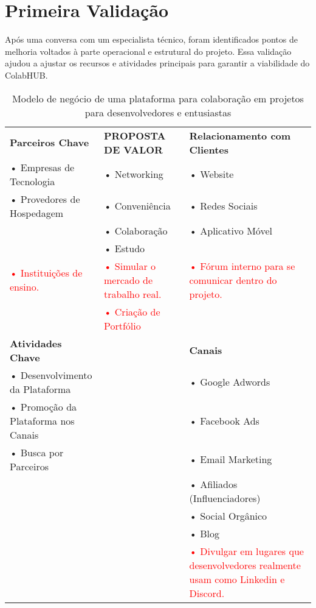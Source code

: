 \documentclass{article}
\begin{document}
\newpage


\section*{Primeira Validação}
Após uma conversa com um especialista técnico, foram identificados pontos de melhoria voltados à parte operacional e estrutural do projeto. Essa validação ajudou a ajustar os recursos e atividades principais para garantir a viabilidade do ColabHUB.

\vspace{0.5cm}

\begin{table}[H]
\centering
\caption{Modelo de negócio de uma plataforma para colaboração em projetos para desenvolvedores e entusiastas}
\renewcommand{\arraystretch}{1.8}
\setlength{\tabcolsep}{4pt}
\begin{tabular}{|p{6cm}|p{6cm}|p{6cm}|}
\hline
\rowcolor{lightgray}
\textbf{Parceiros Chave} &
\centering\textbf{PROPOSTA DE VALOR} &
\textbf{Relacionamento com Clientes} \\
\cline{1-1}\cline{2-2}\cline{3-3}
• Empresas de Tecnologia & • Networking & • Website \\
• Provedores de Hospedagem & • Conveniência & • Redes Sociais \\
& • Colaboração & • Aplicativo Móvel \\
& • Estudo & \\
\textcolor{red}{• Instituições de ensino.} &
\textcolor{red}{• Simular o mercado de trabalho real.} &
\textcolor{red}{• Fórum interno para se comunicar dentro do projeto.} \\
& \textcolor{red}{• Criação de Portfólio} &
\\
\hline
\rowcolor{lightgray}
\textbf{Atividades Chave} & & \textbf{Canais} \\
\cline{1-1}\cline{2-2}\cline{3-3}
• Desenvolvimento da Plataforma & & • Google Adwords \\
• Promoção da Plataforma nos Canais & & • Facebook Ads \\
• Busca por Parceiros & & • Email Marketing \\
& & • Afiliados (Influenciadores) \\
& & • Social Orgânico \\
& & • Blog \\
& & 
\textcolor{red}{• Divulgar em lugares que desenvolvedores realmente usam como Linkedin e Discord.} \\

\end{tabular}
\end{table}
\end{document}
